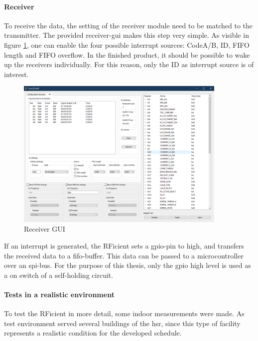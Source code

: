 \paragraph{Receiver}
To receive the data, the setting of the receiver module need to be matched to the transmitter.
The provided receiver-\acs{gui} makes this step very simple.
As visible in figure \ref{development:rx}, one can enable the four possible interrupt sources: CodeA/B, ID, FIFO length and FIFO overflow.
In the finished product, it should be possible to wake up the receivers individually.
For this reason, only the ID as interrupt source is of interest.
\begin{figure}[ht]
	\centering
	\includegraphics[width=0.9\textwidth]{4-development/hardware/graphics/RXgui.png}
	\caption{Receiver GUI\label{development:rx}}
\end{figure}
If an interrupt is generated, the RFicient sets a \acs{gpio}-pin to high, and transfers the received data to a \acs{fifo}-buffer.
This data can be passed to a microcontroller over an \acs{spi}-bus.
For the purpose of this thesis, only the \acs{gpio} high level is used as a on switch of a self-holding circuit.

\paragraph{Tests in a realistic environment}
To test the RFicient in more detail, some indoor measurements were made.
As test environment served several buildings of the \acf{hsr}, since this type of facility represents a realistic condition for the developed schedule.

